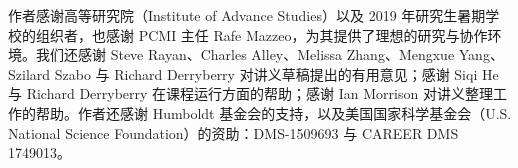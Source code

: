 

作者感谢高等研究院（Institute of Advance Studies）以及 2019 年研究生暑期学校的组织者，也感谢 PCMI 主任 Rafe Mazzeo，为其提供了理想的研究与协作环境。我们还感谢 Steve Rayan、Charles Alley、Melissa Zhang、Mengxue Yang、Szilard Szabo 与 Richard Derryberry 对讲义草稿提出的有用意见；感谢 Siqi He 与 Richard Derryberry 在课程运行方面的帮助；感谢 Ian Morrison 对讲义整理工作的帮助。作者还感谢 Humboldt 基金会的支持，以及美国国家科学基金会（U.S. National Science Foundation）的资助：DMS-1509693 与 CAREER DMS 1749013。

